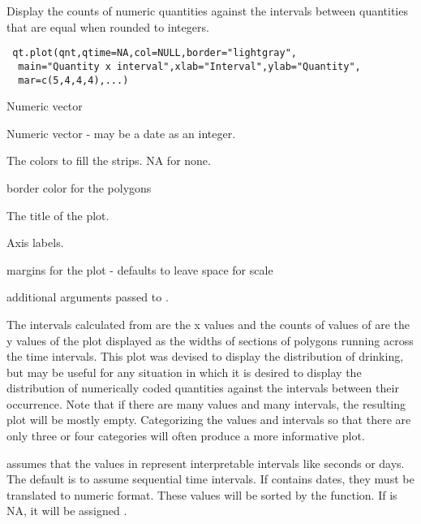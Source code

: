 \begin{Description}\relax
Display the counts of numeric quantities against the intervals between 
quantities that are equal when rounded to integers.
\end{Description}
\begin{Usage}
\begin{verbatim}
 qt.plot(qnt,qtime=NA,col=NULL,border="lightgray",
  main="Quantity x interval",xlab="Interval",ylab="Quantity",
  mar=c(5,4,4,4),...)
\end{verbatim}
\end{Usage}
\begin{Arguments}
\begin{ldescription}
\item[\code{qnt}] Numeric vector
\item[\code{qtime}] Numeric vector - may be a date as an integer.
\item[\code{col}] The colors to fill the strips. NA for none.
\item[\code{border}] border color for the polygons
\item[\code{main}] The title of the plot.
\item[\code{xlab,ylab}] Axis labels.
\item[\code{mar}] margins for the plot - defaults to leave space for scale
\item[\code{...}] additional arguments passed to .
\end{ldescription}
\end{Arguments}
\begin{Details}\relax
The intervals calculated from  are the x values and the counts
of values of  are the y values of the plot displayed as the widths
of sections of polygons running across the time intervals. This plot was
devised to display the distribution of drinking, but may be useful for any
situation in which it is desired to display the distribution of numerically
coded quantities against the intervals between their occurrence. Note that if
there are many values and many intervals, the resulting plot will be mostly
empty. Categorizing the values and intervals so that there are only three or
four categories will often produce a more informative plot.

 assumes that the values in  represent interpretable
intervals like seconds or days. The default is to assume sequential time
intervals. If  contains dates, they must be translated to
numeric format. These values will be sorted by the function. If  is NA,
it will be assigned .
\end{Details}
